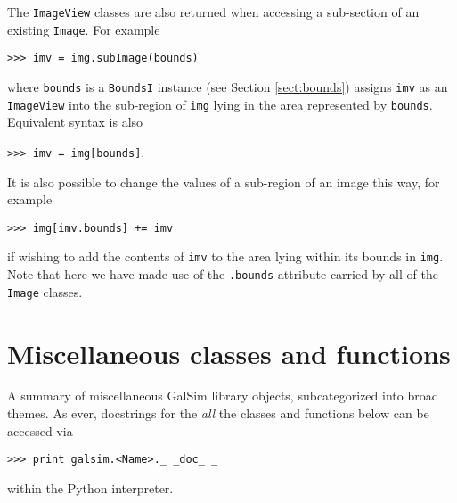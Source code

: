 \documentclass[preprint,11pt]{aastex}
\begin{document}
The \texttt{ImageView} classes are also returned when accessing a
sub-section of an existing \texttt{Image}.  For example

{\tt >>> imv = img.subImage(bounds)}

where \texttt{bounds} is a \texttt{BoundsI} instance (see Section
\ref{sect:bounds}) assigns \texttt{imv} as an \texttt{ImageView} into
the sub-region of \texttt{img} lying in the area represented
by \texttt{bounds}.  Equivalent syntax is also

{\tt >>> imv = img[bounds]}.

It is also possible to change the values of a sub-region of an image
this way, for example

{\tt >>> img[imv.bounds] += imv}

if wishing to add the contents of \texttt{imv} to the area lying
within its bounds in \texttt{img}.  Note that here we have made use of
the \texttt{.bounds} attribute carried by all of the \texttt{Image} classes.

\section{Miscellaneous classes and functions}\label{sect:misc}

A summary of miscellaneous GalSim library objects, subcategorized into
broad themes.  As ever, docstrings for the \emph{all} the classes and functions below can be accessed via

{\tt >>> print galsim.<Name>.\_\,\_doc\_\,\_}

within the Python interpreter.
\end{document}
